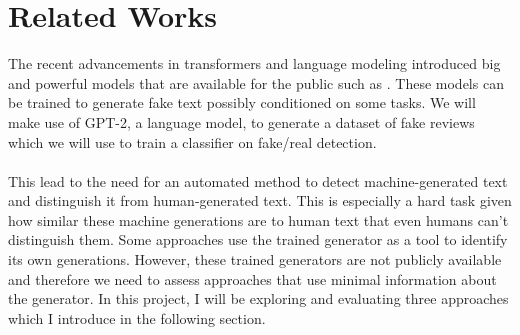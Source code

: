 \documentclass{article}
\begin{document}
\section{Related Works}
The recent advancements in transformers and language modeling introduced big and powerful models that are available for the public such as \cite{gpt}\cite{t5}\cite{bert}. These models can be trained to generate fake text possibly conditioned on some tasks. We will make use of GPT-2, a language model, to generate a dataset of fake reviews which we will use to train a classifier on fake/real detection. \\\\
This lead to the need for an automated method to detect machine-generated text and distinguish it from human-generated text. This is especially a hard task given how similar these machine generations are to human text \cite{adelani2019generating} that even humans can't distinguish them. Some approaches \cite{zellers2020defending} use the trained generator as a tool to identify its own generations. However, these trained generators are not publicly available and therefore we need to assess approaches that use minimal information about the generator. In this project, I will be exploring and evaluating three approaches which I introduce in the following section.
\end{document}
